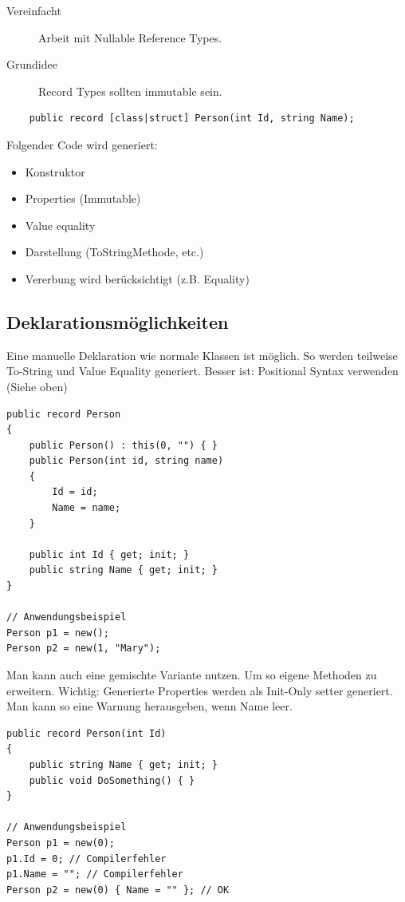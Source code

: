 \documentclass[
a4paper,
oneside,
10pt,
fleqn,
headsepline,
toc=listofnumbered, 
bibliography=totocnumbered]{scrartcl}
\begin{document}
\begin{description}

	\item[Vereinfacht] Arbeit mit Nullable Reference Types.
	\item[Grundidee] Record Types sollten immutable sein.
\end{description}
\begin{lstlisting}
	public record [class|struct] Person(int Id, string Name);
\end{lstlisting}

Folgender Code wird generiert:
\begin{itemize}
	\item Konstruktor
	\item Properties (Immutable)
	\item Value equality
	\item Darstellung (ToStringMethode, etc.)
	\item Vererbung wird berücksichtigt (z.B. Equality)

\end{itemize}
\subsection{Deklarationsmöglichkeiten}
Eine manuelle Deklaration wie normale Klassen ist möglich. So werden teilweise To-String und Value Equality generiert. Besser ist: Positional Syntax verwenden (Siehe oben)
\begin{lstlisting}
public record Person
{
    public Person() : this(0, "") { }
    public Person(int id, string name)
    {
        Id = id;
        Name = name;
	}

    public int Id { get; init; }
    public string Name { get; init; }
}

// Anwendungsbeispiel
Person p1 = new();
Person p2 = new(1, "Mary");
\end{lstlisting}

Man kann auch eine gemischte Variante nutzen. Um so eigene Methoden zu erweitern. Wichtig: Generierte Properties werden als Init-Only setter generiert. Man kann so eine Warnung herausgeben, wenn Name leer.
\begin{lstlisting}
public record Person(int Id)
{
    public string Name { get; init; }
    public void DoSomething() { }
}

// Anwendungsbeispiel
Person p1 = new(0);
p1.Id = 0; // Compilerfehler
p1.Name = ""; // Compilerfehler
Person p2 = new(0) { Name = "" }; // OK
\end{lstlisting}
\end{document}
